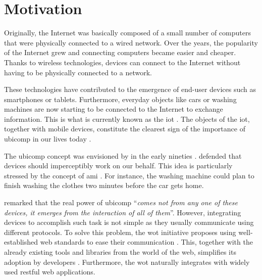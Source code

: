 \section{Motivation}
\label{sec:Motivation}


Originally, the Internet was basically composed of a small number of computers that were physically connected to a wired network.
Over the years, the popularity of the Internet grew and connecting computers became easier and cheaper.
Thanks to wireless technologies, devices can connect to the Internet without having to be physically connected to a network.

These technologies have contributed to the emergence of end-user devices such as smartphones or tablets.
Furthermore, everyday objects like cars or washing machines are now starting to be connected to the Internet to exchange information.
This is what is currently known as the \ac{iot} \citep{atzori_internet_2010}.
The objects of the \ac{iot}, together with mobile devices, constitute the clearest sign of the importance of \acf{ubicomp} in our lives today \citep{caceres_ubicomp_2012}.

The \ac{ubicomp} concept was envisioned by \citeauthor{weiser1991computer} in the early nineties \citep{weiser1991computer}. %
\citeauthor{weiser1991computer} defended that devices should imperceptibly work on our behalf. %
This idea is particularly stressed by the concept of \ac{ami} \citep{ramos_ambient_2008}.
For instance, the washing machine could plan to finish washing the clothes two minutes before the car gets home.


\bigskip


\citeauthor{weiser1991computer} remarked that the real power of \ac{ubicomp} ``\emph{comes not from any one of these devices, it emerges from the interaction of all of them}''.
However, integrating devices to accomplish such task is not simple as they usually communicate using different protocols.
To solve this problem, the \ac{wot} initiative proposes using well-established web standards to ease their communication \citep{guinard_thesis_2011}.
This, together with the already existing tools and libraries from the world of the web, simplifies its adoption by developers \citep{guinard_search_2011}.
Furthermore, the \ac{wot} naturally integrates with widely used \acs{rest}ful web applications.

